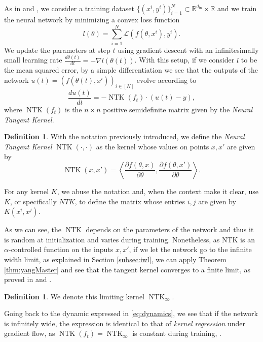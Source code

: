 \documentclass[11pt,notitlepage]{article}
\numberwithin{equation}{section}
\def\R{{\mathbb{R}}}
\DeclareMathOperator{\NTK}{NTK}
\theoremstyle{remark}
\theoremstyle{definition}
\newtheorem{definition_body}[theorem]{Definition}
\newcommand{\definition}[1]{
	\theoremstyle{definition}
	\begin{definition_body}
		#1
	\end{definition_body}
	\theoremstyle{plain}
}
\begin{document}
	As in \cite{jacot2018neural} and \cite{arora2019exact}, we consider a training dataset $\{(x^i, y^i)\}_{i=1}^N \subset \R^{d_\text{in}} \times \R$ and we train the neural network by minimizing a convex loss function \[l(\theta) = \sum_{i=1}^N\mathcal{L}(f(\theta, x^i), y^i). \]
	We update the parameters at step $t$ using gradient descent with an infinitesimally small learning rate $\frac{d\theta(t)}{dt} = - \nabla l(\theta(t))$.
	With this setup, if we consider $l$ to be the mean squared error, by a simple differentiation \cite[Lemma 3.1]{arora2019exact} we see that the outputs of the network $u(t) = (f(\theta(t), x^i))_{i\in [N]}$ evolve according to 
	\begin{equation}\label{eq:dynamics}
	\frac{du(t)}{dt} = -\NTK(f_t) \cdot (u(t) - y),
	\end{equation}
	where $\NTK(f_t)$ is the $n \times n$ positive semidefinite matrix given by the \emph{Neural Tangent Kernel}.
	
	\definition{
		With the notation previously introduced, we define the \emph{Neural Tangent Kernel} $\NTK(\cdot, \cdot)$ as the kernel whose values on points $x, x'$ are given by 
		\begin{equation}\label{eq:ntk}
		\NTK(x, x') = \left\langle \frac{\partial f (\theta, x)}{\partial \theta}, \frac{\partial f (\theta, x')}{\partial \theta} \right\rangle. 
		\end{equation}
		
		For any kernel $K$, we abuse the notation and, when the context make it clear, use $K$, or specifically $NTK$, to define the matrix whose entries $i,j$ are given by $K(x^i,x^j)$.
	}
	
	As we can see, the $\NTK$ depends on the parameters of the network and thus it is random at initialization and varies during training.
	Nonetheless, as NTK is an $\alpha$-controlled function on the inputs $x, x'$, if we let the network go to the infinite width limit, as explained in Section \ref{subsec:iwl}, we can apply Theorem \ref{thm:yangMaster} and see that the tangent kernel converges to a finite limit, as proved in \cite{jacot2018neural} and \cite{yang2019scaling}.
	
	\definition{We denote this limiting kernel $\NTK_\infty$.}
	
	Going back to the dynamic expressed in \eqref{eq:dynamics}, we see that if the network is infinitely wide, the expression is identical to that of \emph{kernel regression} under gradient flow, as $\NTK(f_t) = \NTK_\infty$ is constant during training, \cite{jacot2018neural}.
	
\end{document}
